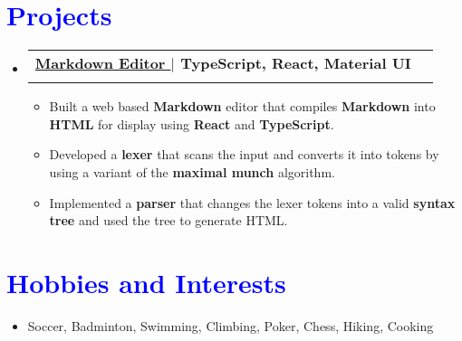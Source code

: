 \documentclass[letterpaper,11pt]{article}
\makeatletter
\newcommand{\resumeItem}[1]{
  \item\small{
    {#1 \vspace{-2pt}}
  }
}
\newcommand{\resumeSubheading}[4]{
  \vspace{-2pt}\item
    \begin{tabular*}{1.0\textwidth}[t]{l@{\extracolsep{\fill}}r}
      \textbf{#1} & \textbf{\small #2} \\
      \textit{\small#3} & \textit{\small #4} \\
    \end{tabular*}\vspace{-7pt}
}
\newcommand{\resumeSubHeadingListStart}{\begin{itemize}[leftmargin=0.0in, label={}]}
\newcommand{\resumeSubHeadingListEnd}{\end{itemize}}
\newcommand{\resumeItemListStart}{\begin{itemize}[leftmargin=0.2in]}
\newcommand{\resumeItemListEnd}{\end{itemize}\vspace{-5pt}}
\makeatother
\begin{document}
\section{\textcolor{Blue}{Projects}}
  \resumeSubHeadingListStart


    
    \resumeSubheading
      {{\href{https://markdown.torychen.com}{\textcolor{NavyBlue}{Markdown Editor  }\faGithub}} $|$ \textnormal{TypeScript, React, Material UI}}{}
      {}{}
      \vspace{-16pt}
      \resumeItemListStart
        \resumeItem{Built a web based \textbf{Markdown} editor that compiles \textbf{Markdown} into \textbf{HTML} for display using \textbf{React} and \textbf{TypeScript}.}
        \resumeItem{Developed a \textbf{lexer} that scans the input and converts it into tokens by using a variant of the \textbf{maximal munch} algorithm.}
        \resumeItem{Implemented a \textbf{parser} that changes the lexer tokens into a valid \textbf{syntax tree} and used the tree to generate HTML.}
    \resumeItemListEnd
    
  \resumeSubHeadingListEnd
\vspace{-12pt}

\section{\textcolor{Blue}{Hobbies and Interests}}
  \resumeItemListStart
    \resumeItem{Soccer, Badminton, Swimming, Climbing, Poker, Chess, Hiking, Cooking}
  \resumeItemListEnd
\end{document}
